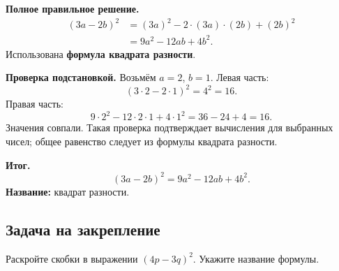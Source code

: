 \documentclass[a4paper,11pt]{article}
\newcommand{\outcome}{\textcolor{accent}{\textbf{Итог.}}\ }
\begin{document}
\textbf{Полное правильное решение.}
\begin{align*}
(3a-2b)^2
  &= (3a)^2-2\cdot(3a)\cdot(2b)+(2b)^2\\
  &= 9a^2-12ab+4b^2.
\end{align*}
Использована \textbf{формула квадрата разности}.

\textbf{Проверка подстановкой.} Возьмём $a=2$, $b=1$. Левая часть:
\[
(3\cdot2-2\cdot1)^2=4^2=16.
\]
Правая часть:
\[
9\cdot2^2-12\cdot2\cdot1+4\cdot1^2=36-24+4=16.
\]
Значения совпали. Такая проверка подтверждает вычисления для выбранных чисел; общее равенство следует из формулы квадрата разности.

\outcome
\[
\boxed{(3a-2b)^2=9a^2-12ab+4b^2.}
\]
\textbf{Название:} квадрат разности.

\subsection*{Задача на закрепление}
Раскройте скобки в выражении $(4p-3q)^2$. Укажите название формулы.
\end{document}
